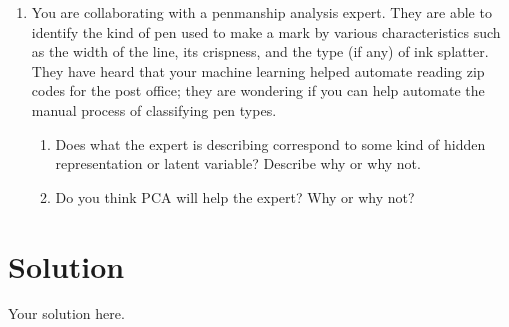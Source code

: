 \documentclass[submit]{../harvardml}
\newenvironment{solution}
  {\color{blue}\section*{Solution}}
{}
\begin{document}
\begin{problem}
\begin{enumerate}
    \item You are collaborating with a penmanship analysis expert.  They
    are able to identify the kind of pen used to make a mark by various
    characteristics such as the width of the line, its crispness, and
    the type (if any) of ink splatter.  They have heard that your
    machine learning helped automate reading zip codes for the post
    office; they are wondering if you can help automate the manual
    process of classifying pen types.
    \begin{enumerate}

      \item Does what the expert is describing correspond to some kind
      of hidden representation or latent variable?  Describe why or
      why not.
      
      \item Do you think PCA will help the expert?  Why or why not?
    \end{enumerate}
  \end{enumerate}
\end{problem}

\newpage

\begin{solution}
	Your solution here.
\end{solution}
\end{document}
